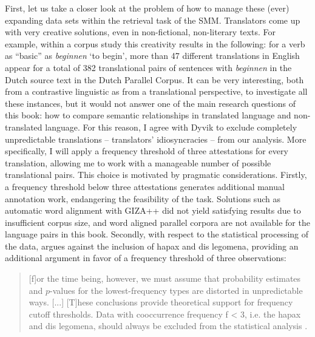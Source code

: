 First, let us take a closer look at the problem of how to manage these (ever) expanding data sets within the retrieval task of the SMM. Translators come up with very creative solutions, even in non-fictional, non-literary texts. For example, within a corpus study this creativity results in the following: for a verb as ``basic'' as \textit{beginnen} `to begin', more than 47 different translations in English appear for a total of 382 translational pairs of sentences with \textit{beginnen} in the Dutch source text in the Dutch Parallel Corpus. It can be very interesting, both from a contrastive linguistic as from a translational perspective, to investigate all these instances, but it would not answer one of the main research questions of this book: how to compare semantic relationships in translated language and non-translated language. For this reason, I agree with Dyvik to exclude completely unpredictable translations – translators’ idiosyncracies – from our analysis. More specifically, I will apply a frequency threshold of three attestations for every translation, allowing me to work with a manageable number of possible translational pairs. This choice is motivated by pragmatic considerations. Firstly, a frequency threshold below three attestations generates additional manual annotation work, endangering the feasibility of the task. Solutions such as automatic word alignment with GIZA++ did not yield satisfying results due to insufficient corpus size, and word aligned parallel corpora are not available for the language pairs in this book. Secondly, with respect to the statistical processing of the data, \citet[133]{evert_statistics_2004} argues against the inclusion of hapax and dis legomena, providing an additional argument in favor of a frequency threshold of three observations:

\begin{quote}
[f]or the time being, however, we must assume that probability estimates and $p$-values for the lowest-frequency types are distorted in unpredictable ways. [...] [T]hese conclusions provide theoretical support for frequency cutoff thresholds. Data with cooccurrence frequency f < 3, i.e. the hapax and dis legomena, should always be excluded from the statistical analysis \citep[133]{evert_statistics_2004}.
\end{quote}

